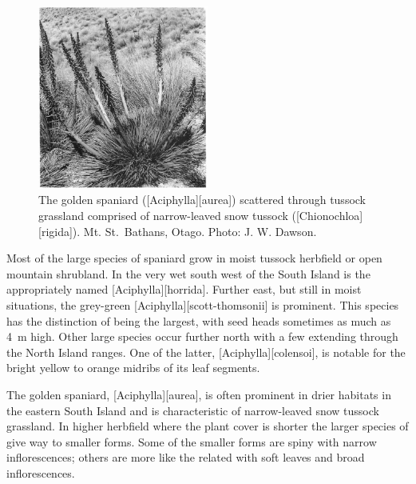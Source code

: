 \begin{figure}
	\includegraphics[width=0.5\textwidth]{graphics/figure98golden-spaniard.jpg}
	\centering
	\caption[The golden spaniard]{The golden spaniard ([Aciphylla][aurea]) scattered through tussock grassland comprised of narrow-leaved snow tussock ([Chionochloa][rigida]). Mt. St.\ Bathans, Otago.
	Photo: J. W. Dawson.}%
	\label{fig:98golden-spaniard}
\end{figure}

Most of the large species of spaniard grow in moist tussock herbfield or open mountain shrubland.
In the very wet south west of the South Island is the appropriately named [Aciphylla][horrida].
Further east, but still in moist situations, the grey-green [Aciphylla][scott-thomsonii] is prominent.
This species has the distinction of being the largest, with seed heads sometimes as much as \SI{4}{\metre} high.
Other large species occur further north with a few extending through the North Island ranges.
One of the latter, [Aciphylla][colensoi], is notable for the bright yellow to orange midribs of its leaf segments.

The golden spaniard, [Aciphylla][aurea], is often prominent in drier habitats in the eastern South Island and is characteristic of narrow-leaved snow tussock grassland.
In higher herbfield where the plant cover is shorter the larger species of  give way to smaller forms.
Some of the smaller forms are spiny with narrow inflorescences; others are more like the related  with soft leaves and broad inflorescences.

